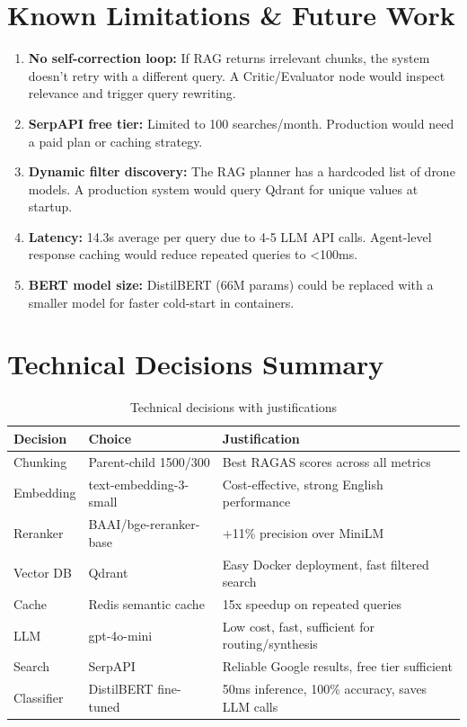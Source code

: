 \documentclass[12pt,a4paper]{article}
\begin{document}
\section{Known Limitations \& Future Work}

\begin{enumerate}
  \item \textbf{No self-correction loop:} If RAG returns irrelevant chunks, the system doesn't retry with a different query. A Critic/Evaluator node would inspect relevance and trigger query rewriting.
  \item \textbf{SerpAPI free tier:} Limited to 100 searches/month. Production would need a paid plan or caching strategy.
  \item \textbf{Dynamic filter discovery:} The RAG planner has a hardcoded list of drone models. A production system would query Qdrant for unique values at startup.
  \item \textbf{Latency:} 14.3s average per query due to 4-5 LLM API calls. Agent-level response caching would reduce repeated queries to <100ms.
  \item \textbf{BERT model size:} DistilBERT (66M params) could be replaced with a smaller model for faster cold-start in containers.
\end{enumerate}

\section{Technical Decisions Summary}

\begin{table}[H]
\centering
\small
\begin{tabular}{lll}
\toprule
\textbf{Decision} & \textbf{Choice} & \textbf{Justification} \\
\midrule
Chunking & Parent-child 1500/300 & Best RAGAS scores across all metrics \\
Embedding & text-embedding-3-small & Cost-effective, strong English performance \\
Reranker & BAAI/bge-reranker-base & +11\% precision over MiniLM \\
Vector DB & Qdrant & Easy Docker deployment, fast filtered search \\
Cache & Redis semantic cache & 15x speedup on repeated queries \\
LLM & gpt-4o-mini & Low cost, fast, sufficient for routing/synthesis \\
Search & SerpAPI & Reliable Google results, free tier sufficient \\
Classifier & DistilBERT fine-tuned & 50ms inference, 100\% accuracy, saves LLM calls \\
\bottomrule
\end{tabular}
\caption{Technical decisions with justifications}
\end{table}
\end{document}
